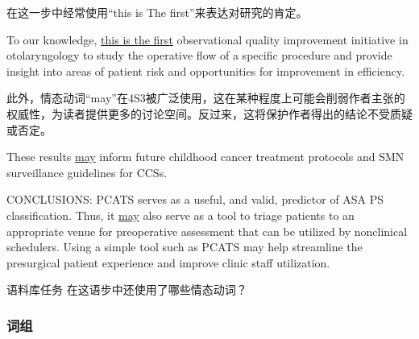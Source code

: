 \documentclass[a4paper]{ctexbook}
\begin{document}
    在这一步中经常使用“this is The first”来表达对研究的肯定。

    \begin{eg}{}
      To our knowledge, \uline{this is the first} observational quality improvement initiative in otolaryngology to study the operative flow of a specific procedure and provide insight into areas of patient risk and opportunities for improvement in efficiency.  
    \end{eg}
    
    此外，情态动词“may”在4S3被广泛使用，这在某种程度上可能会削弱作者主张的权威性，为读者提供更多的讨论空间。反过来，这将保护作者得出的结论不受质疑或否定。

    \begin{eg}{}
      These results \uline{may} inform future childhood cancer treatment protocols and SMN surveillance guidelines for CCSs.
    \end{eg}

    \begin{eg}{}
      CONCLUSIONS: PCATS serves as a useful, and valid, predictor of ASA PS classification. Thus, it \uline{may} also serve as a tool to triage patients to an appropriate venue for preoperative assessment that can be utilized by nonclinical schedulers. Using a simple tool such as PCATS may help streamline the presurgical patient experience and improve clinic staff utilization.
    \end{eg}

    \begin{task}{\heiti 语料库任务}
      在这语步中还使用了哪些情态动词？
    \end{task}

    \subsubsection{词组}
\end{document}
